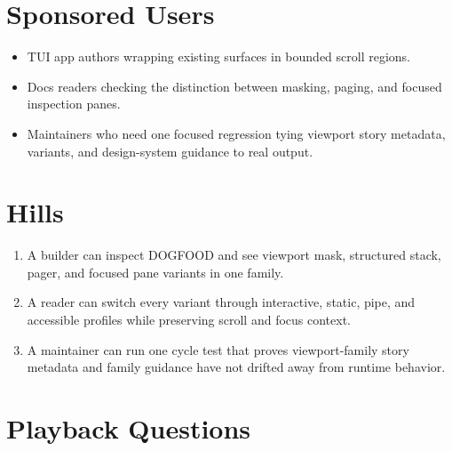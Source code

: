 \section{Sponsored Users}\label{record-100-sponsored-users}

\begin{itemize}
\tightlist
\item
  TUI app authors wrapping existing surfaces in bounded scroll regions.
\item
  Docs readers checking the distinction between masking, paging, and focused inspection panes.
\item
  Maintainers who need one focused regression tying viewport story metadata, variants, and design-system guidance to real output.
\end{itemize}

\section{Hills}\label{record-100-hills}

\begin{enumerate}
\def\labelenumi{\arabic{enumi}.}
\tightlist
\item
  A builder can inspect DOGFOOD and see viewport mask, structured stack, pager, and focused pane variants in one family.
\item
  A reader can switch every variant through interactive, static, pipe, and accessible profiles while preserving scroll and focus context.
\item
  A maintainer can run one cycle test that proves viewport-family story metadata and family guidance have not drifted away from runtime behavior.
\end{enumerate}

\section{Playback Questions}\label{record-100-playback-questions}

